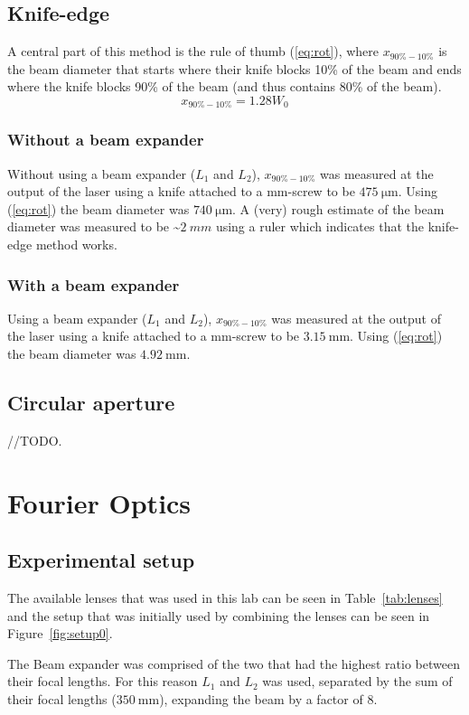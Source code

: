 \documentclass[12pt,a4paper]{article}
\begin{document}
\subsection{Knife-edge}
A central part of this method is the rule of thumb (\ref{eq:rot}), where $x_{90\%-10\%}$ is the beam diameter that starts where their knife blocks 10\% of the beam and ends where the knife blocks 90\% of the beam (and thus contains 80\% of the beam).
\begin{equation}
  \label{eq:rot}
  x_{90\%-10\%}=1.28W_0
\end{equation}
\subsubsection{Without a beam expander}
Without using a beam expander ($L_1$ and $L_2$), $x_{90\%-10\%}$ was measured at the output of the laser using a knife attached to a mm-screw to be $\SI{475}{\micro\metre}$. Using (\ref{eq:rot}) the beam diameter was $\SI{740}{\micro\metre}$. A (very) rough estimate of the beam diameter was measured to be \textasciitilde$\SI{2}{mm}$ using a ruler which indicates that the knife-edge method works.

\subsubsection{With a beam expander}
Using a beam expander ($L_1$ and $L_2$), $x_{90\%-10\%}$ was measured at the output of the laser using a knife attached to a mm-screw to be $\SI{3.15}{\milli\metre}$. Using (\ref{eq:rot}) the beam diameter was $\SI{4.92}{\milli\metre}$.

\subsection{Circular aperture}
//TODO.
\section{Fourier Optics}
\subsection{Experimental setup}\label{sec:setup}
The available lenses that was used in this lab can be seen in Table~\ref{tab:lenses} and the setup that was initially used by combining the lenses can be seen in Figure~\ref{fig:setup0}.

The Beam expander was comprised of the two that had the highest ratio between their focal lengths. For this reason $L_1$ and $L_2$ was used, separated by the sum of their focal lengths ($\SI{350}{\milli\metre}$), expanding the beam by a factor of 8.
\end{document}
